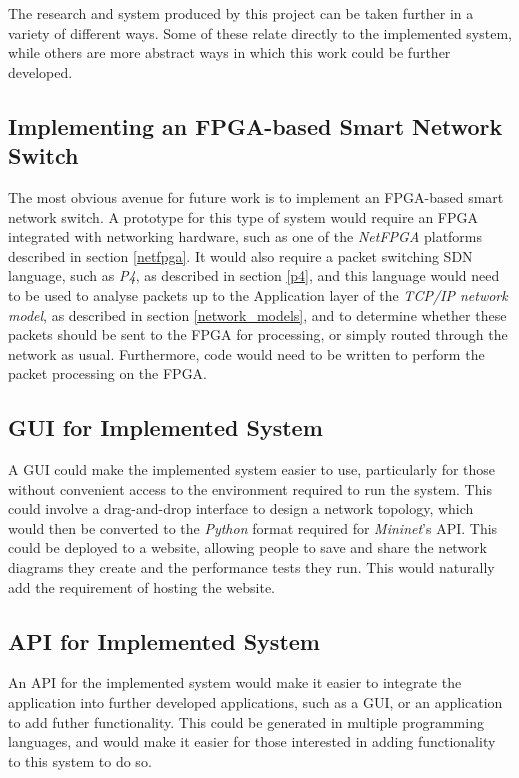 


%
%
%

The research and system produced by this project can be taken further in a variety of different ways. Some of these relate directly to the implemented system, while others are more abstract ways in which this work could be further developed.

\subsection{Implementing an FPGA-based Smart Network Switch}
The most obvious avenue for future work is to implement an FPGA-based smart network switch. A prototype for this type of system would require an FPGA integrated with networking hardware, such as one of the \textit{NetFPGA} platforms described in section \ref{netfpga}. It would also require a packet switching SDN language, such as \textit{P4}, as described in section \ref{p4}, and this language would need to be used to analyse packets up to the Application layer of the \textit{TCP/IP network model}, as described in section \ref{network_models}, and to determine whether these packets should be sent to the FPGA for processing, or simply routed through the network as usual. Furthermore, code would need to be written to perform the packet processing on the FPGA.

\subsection{GUI for Implemented System}
A GUI could make the implemented system easier to use, particularly for those without convenient access to the environment required to run the system. This could involve a drag-and-drop interface to design a network topology, which would then be converted to the \textit{Python} format required for \textit{Mininet}'s API. This could be deployed to a website, allowing people to save and share the network diagrams they create and the performance tests they run. This would naturally add the requirement of hosting the website.

\subsection{API for Implemented System}
An API for the implemented system would make it easier to integrate the application into further developed applications, such as a GUI, or an application to add futher functionality. This could be generated in multiple programming languages, and would make it easier for those interested in adding functionality to this system to do so.


